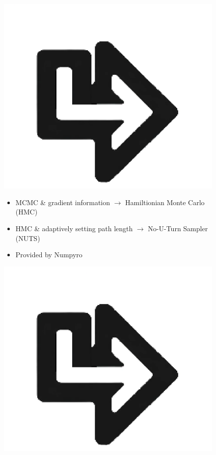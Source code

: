 \documentclass[compress]{beamer}
\begin{document}
\begin{frame}
\begin{figure}[]
{			\begin{minipage}[c][0.33\paperheight][c]{\linewidth}
				\begin{minipage}{0.1\linewidth}
					\includegraphics[angle=270, width=\linewidth]{images/left_turn_arrow.eps}
				\end{minipage}
				\hfill
				\begin{minipage}{0.58\linewidth}
					{\footnotesize \begin{itemize} 
							\item MCMC \& gradient information $\rightarrow$ Hamiltionian Monte Carlo (HMC)
							\item HMC \& adaptively setting path length $\rightarrow$ No-U-Turn Sampler (NUTS)
							\item Provided by Numpyro
					\end{itemize}}
				\end{minipage}
				\hfill
				\begin{minipage}{0.1\linewidth}
					\includegraphics[angle=180, width=\linewidth]{images/left_turn_arrow.eps}

\end{minipage}
\end{minipage}}
\end{figure}
\end{frame}
\end{document}
